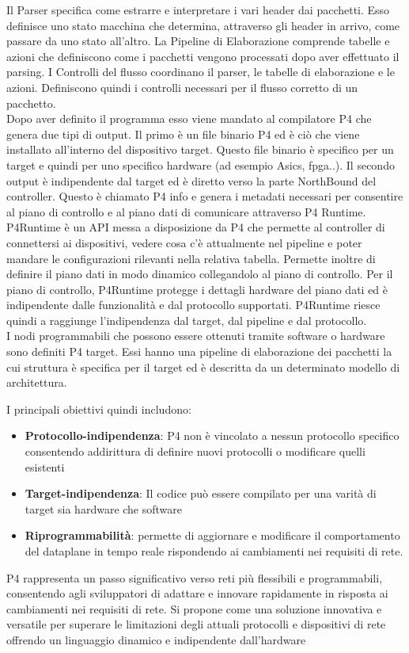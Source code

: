Il Parser specifica come estrarre e interpretare i vari header dai pacchetti. Esso definisce uno stato macchina che determina, attraverso gli header in arrivo, come passare da uno stato all'altro. 
La Pipeline di Elaborazione comprende tabelle e azioni che definiscono come i pacchetti vengono processati dopo aver effettuato il parsing.
I Controlli del flusso coordinano il parser, le tabelle di elaborazione e le azioni. Definiscono quindi i controlli necessari per il flusso corretto di un pacchetto.
\\Dopo aver definito il programma esso viene mandato al compilatore P4 che genera due tipi di output. 
Il primo è un file binario P4 ed è ciò che viene installato all'interno del dispositivo target.
Questo file binario è specifico per un target e quindi per uno specifico hardware (ad esempio Asics, fpga..).
Il secondo output è indipendente dal target ed è diretto verso la parte NorthBound del controller. Questo è chiamato P4 info e genera i metadati necessari per consentire al piano di controllo e al piano
dati di comunicare attraverso P4 Runtime.
\\P4Runtime è un API messa a disposizione da P4 che permette al controller di connettersi ai dispositivi, vedere cosa c'è attualmente nel pipeline 
e poter mandare le configurazioni rilevanti nella relativa tabella. Permette inoltre di definire il piano dati in modo dinamico collegandolo al piano di controllo. 
Per il piano di controllo, P4Runtime protegge i dettagli hardware del piano dati ed è indipendente dalle funzionalità e dal protocollo supportati.
P4Runtime riesce quindi a raggiunge l'indipendenza dal target, dal pipeline e dal protocollo.
\\I nodi programmabili che possono essere ottenuti tramite software o hardware sono definiti P4 target.
Essi hanno una pipeline di elaborazione dei pacchetti la cui struttura è specifica per il target ed è descritta da un determinato modello di architettura.

I principali obiettivi quindi includono:
\begin{itemize}
    \item \textbf{Protocollo-indipendenza}: P4 non è vincolato a nessun protocollo specifico consentendo addirittura di definire nuovi protocolli o modificare quelli esistenti
    \item \textbf{Target-indipendenza}: Il codice può essere compilato per una varità di target sia hardware che software
    \item \textbf{Riprogrammabilità}: permette di aggiornare e modificare il comportamento del dataplane in tempo reale rispondendo ai cambiamenti nei requisiti di rete.
\end{itemize}
P4 rappresenta un passo significativo verso reti più flessibili e programmabili, consentendo agli sviluppatori di adattare e innovare rapidamente in risposta ai cambiamenti nei requisiti di rete.
Si propone come una soluzione innovativa e versatile per superare le limitazioni degli attuali protocolli e dispositivi di rete offrendo un linguaggio dinamico e indipendente dall'hardware


